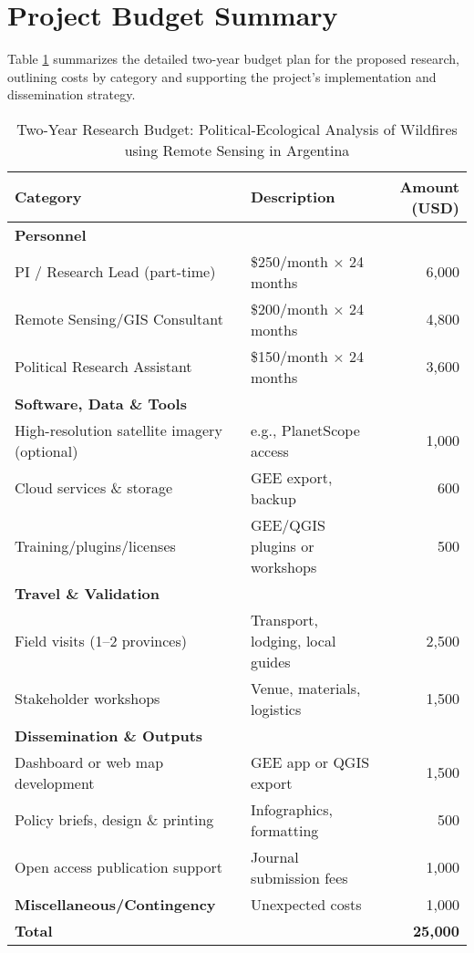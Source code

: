 \section{Project Budget Summary}
Table \ref{tab:budget} summarizes the detailed two-year budget plan for the proposed research, outlining costs by category and supporting the project's implementation and dissemination strategy.

\begin{table}[!ht]
    \centering
    \begin{tabular}{@{}llr@{}} 
        \toprule
        \textbf{Category} & \textbf{Description} & \textbf{Amount (USD)} \\
        \midrule
        \textbf{Personnel} & & \\
            \quad PI / Research Lead (part-time) & \$250/month × 24 months & 6,000 \\
            \quad Remote Sensing/GIS Consultant & \$200/month × 24 months & 4,800 \\
            \quad Political Research Assistant & \$150/month × 24 months & 3,600 \\
        \addlinespace
        \textbf{Software, Data \& Tools} & & \\
            \quad High-resolution satellite imagery (optional) & e.g., PlanetScope access & 1,000 \\
            \quad Cloud services \& storage & GEE export, backup & 600 \\
            \quad Training/plugins/licenses & GEE/QGIS plugins or workshops & 500 \\
        \addlinespace
        \textbf{Travel \& Validation} & & \\
            \quad Field visits (1–2 provinces) & Transport, lodging, local guides & 2,500 \\
            \quad Stakeholder workshops & Venue, materials, logistics & 1,500 \\
        \addlinespace
        \textbf{Dissemination \& Outputs} & & \\
            \quad Dashboard or web map development & GEE app or QGIS export & 1,500 \\
            \quad Policy briefs, design \& printing & Infographics, formatting & 500 \\
            \quad Open access publication support & Journal submission fees & 1,000 \\
        \addlinespace
        \textbf{Miscellaneous/Contingency} & Unexpected costs & 1,000 \\
        \midrule
            \textbf{Total} & & \textbf{25,000} \\
        \bottomrule
    \end{tabular}
    \caption{Two-Year Research Budget: Political-Ecological Analysis of Wildfires using Remote Sensing in Argentina}
    \label{tab:budget}
\end{table}